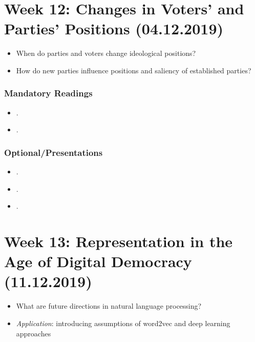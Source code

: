 \documentclass[abstract=on,parskip=full,headings=standardclasses,fontsize=11pt,paper=a4]{scrartcl}
\begin{document}
\section{Week 12: Changes in Voters' and Parties' Positions (04.12.2019)}


\begin{itemize}
\renewcommand\labelitemi{--}
\item When do parties and voters change ideological positions?
\item How do new parties influence positions and saliency of established parties?
\end{itemize}


\subsubsection*{Mandatory Readings}
\begin{itemize}
\item {}.
\item {}.
\end{itemize}



\subsubsection*{Optional/Presentations}
\begin{itemize}
\item {}.
\item {}.
\item {}.
\end{itemize}




\section{Week 13: Representation in the Age of Digital Democracy (11.12.2019)}


\begin{itemize}
\renewcommand\labelitemi{--}
\item What are future directions in natural language processing?
\item \textit{Application}: introducing assumptions of word2vec and deep learning approaches
\end{itemize}
\end{document}

